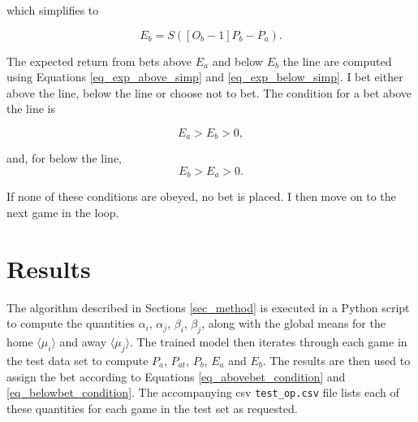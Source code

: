 \documentclass[10pt]{article}
\begin{document}
\noindent which simplifies to

\begin{equation}
\label{eq_exp_below_simp}
E_b = S \left(  \left[ O_b - 1 \right] P_b - P_a  \right).
\end{equation}







\noindent The expected return from bets above $E_a$ and below $E_b$ the line are computed using Equations \ref{eq_exp_above_simp} and \ref{eq_exp_below_simp}. I bet either above the line, below the line or choose not to bet. The condition for a bet above the line is

\begin{equation}
\label{eq_abovebet_condition}
E_a > E_b > 0,
\end{equation}

\noindent and, for below the line,
\begin{equation}
\label{eq_belowbet_condition}
E_b > E_a > 0.
\end{equation}


\noindent If none of these conditions are obeyed, no bet is placed. I then move on to the next game in the loop.
 
 
 
 






\section{Results}
\label{sec_res}


The algorithm described in Sections \ref{sec_method} is executed in a Python script to compute the quantities $\alpha_i$, $\alpha_j$, $\beta_i$, $\beta_j$, along with the global means for the home $\langle \mu_i \rangle$ and away $\langle \mu_j \rangle$. The trained model then iterates through each game in the test data set to compute $P_a$, $P_{at}$, $P_b$, $E_a$ and $E_b$. The results are then used to assign the bet according to Equations \ref{eq_abovebet_condition} and \ref{eq_belowbet_condition}. The accompanying csv \verb|test_op.csv| file lists each of these quantities for each game in the test set as requested. 
\end{document}
